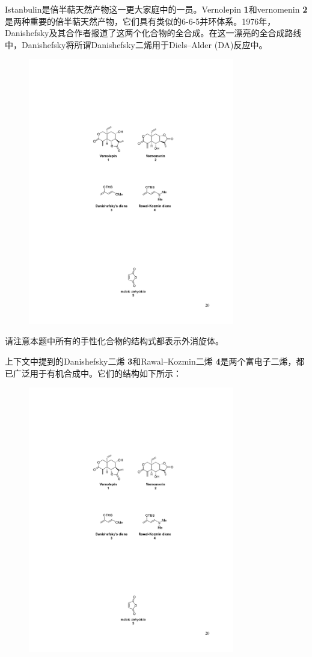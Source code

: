Istanbulin是倍半萜天然产物这一更大家庭中的一员。Vernolepin \textbf{1}和vernomenin \textbf{2}是两种重要的倍半萜天然产物，它们具有类似的6-6-5并环体系。1976年，Danishefsky及其合作者报道了这两个化合物的全合成。在这一漂亮的全合成路线中，Danishefsky将所谓Danishefsky二烯用于Diels--Alder (DA)反应中。

\begin{figure}[h]
	\centering
	\includegraphics[width=9cm]{./pic/t2-3.pdf}
\end{figure}

请注意本题中所有的手性化合物的结构式都表示外消旋体。
\newpage

上下文中提到的Danishefsky二烯 \textbf{3}和Rawal--Kozmin二烯 \textbf{4}是两个富电子二烯，都已广泛用于有机合成中。它们的结构如下所示：

\begin{figure}[h]
	\centering
	\includegraphics[width=9cm]{./pic/t2-4.pdf}
\end{figure}

